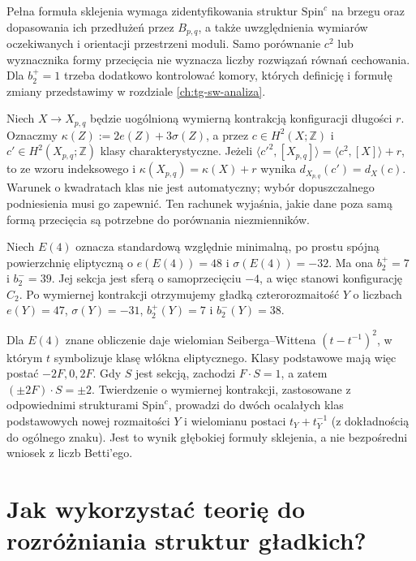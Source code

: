\begin{uwaga}
Pełna formuła sklejenia wymaga zidentyfikowania struktur
$\mathrm{Spin}^c$ na brzegu oraz dopasowania ich przedłużeń
przez $B_{p,q}$, a także uwzględnienia wymiarów
oczekiwanych i orientacji przestrzeni moduli. Samo
porównanie $c^2$ lub wyznacznika formy przecięcia
nie wyznacza liczby rozwiązań równań cechowania.
Dla $b_2^+=1$ trzeba dodatkowo kontrolować komory,
których definicję i formułę zmiany przedstawimy w rozdziale
\ref{ch:tg-sw-analiza}.
\end{uwaga}

\begin{przyklad}
Niech $X\to X_{p,q}$ będzie uogólnioną wymierną kontrakcją
konfiguracji długości $r$. Oznaczmy
$\kappa(Z):=2e(Z)+3\sigma(Z)$, a przez
$c\in H^2(X;\mathbb Z)$ i $c'\in H^2(X_{p,q};\mathbb Z)$
klasy charakterystyczne. Jeżeli
$\langle c'^2,[X_{p,q}]\rangle
=\langle c^2,[X]\rangle+r$, to ze wzoru indeksowego i
$\kappa(X_{p,q})=\kappa(X)+r$ wynika
$d_{X_{p,q}}(c')=d_X(c)$.
Warunek o kwadratach klas nie jest automatyczny;
wybór dopuszczalnego podniesienia musi go zapewnić.
Ten rachunek wyjaśnia, jakie dane poza samą formą
przecięcia są potrzebne do porównania niezmienników.
\end{przyklad}

\begin{przyklad}
Niech $E(4)$ oznacza standardową względnie minimalną,
po prostu spójną powierzchnię eliptyczną o
$e(E(4))=48$ i $\sigma(E(4))=-32$.
Ma ona $b_2^+=7$ i $b_2^-=39$.
Jej sekcja jest sferą o samoprzecięciu $-4$,
a więc stanowi konfigurację $C_2$. Po wymiernej
kontrakcji otrzymujemy gładką czterorozmaitość $Y$
o liczbach $e(Y)=47$, $\sigma(Y)=-31$,
$b_2^+(Y)=7$ i $b_2^-(Y)=38$.

Dla $E(4)$ znane obliczenie daje wielomian
Seiberga--Wittena $(t-t^{-1})^2$, w którym
$t$ symbolizuje klasę włókna eliptycznego.
Klasy podstawowe mają więc postać $-2F,0,2F$.
Gdy $S$ jest sekcją, zachodzi $F\cdot S=1$,
a zatem $(\pm2F)\cdot S=\pm2$.
Twierdzenie o wymiernej kontrakcji, zastosowane
z odpowiednimi strukturami $\mathrm{Spin}^c$,
prowadzi do dwóch ocalałych klas podstawowych
nowej rozmaitości $Y$ i wielomianu postaci
$t_Y+t_Y^{-1}$ (z dokładnością do ogólnego znaku).
Jest to wynik głębokiej formuły sklejenia, a nie
bezpośredni wniosek z liczb Betti'ego.
\end{przyklad}

\section{Jak wykorzystać teorię do rozróżniania struktur gładkich?}
\label{sec:tg-sw-exotic}

